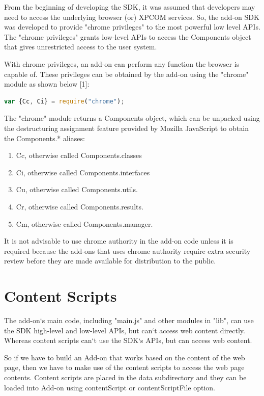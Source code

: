 From the beginning of developing the SDK, it was assumed that developers may need to access the underlying browser (or) XPCOM services. So, the add-on SDK was developed to provide "chrome privileges" to the most powerful low level APIs. The "chrome privileges" grants low-level APIs to access the Components object that gives unrestricted access to the user system.  

With chrome privileges, an add-on can perform any function the browser is capable of. These privileges can be obtained by the add-on using the "chrome" module as shown below [1]:
\begin{lstlisting}[frame=single,language=JavaScript,numbers=none,mathescape=false]
var {Cc, Ci} = require("chrome");
\end{lstlisting}
The "chrome" module returns a Components object, which can be unpacked using the destructuring assignment feature provided by Mozilla JavaScript to obtain the Components.* aliases: 
\begin{enumerate}
\item Cc, otherwise called Components.classes
\item Ci, otherwise called Components.interfaces
\item Cu, otherwise called Components.utils.
\item Cr, otherwise called Components.results.
\item Cm, otherwise called Components.manager.
\end{enumerate}
It is not advisable to use chrome authority in the add-on code unless it is required because the add-ons that uses chrome authority require extra security review before they are made available for distribution to the public.

\section{Content Scripts} \label{sec:contentscript}

The add-on`s main code, including "main.js" and other modules in "lib", can use the SDK high-level and low-level APIs, but can`t access web content directly. Whereas content scripts can`t use the SDK`s APIs, but can access web content.

So if we have to build an Add-on that works based on the content of the web page, then we have to make use of the content scripts to access the web page contents. Content scripts are placed in the data subdirectory and they can be loaded into Add-on using contentScript or contentScriptFile option.

